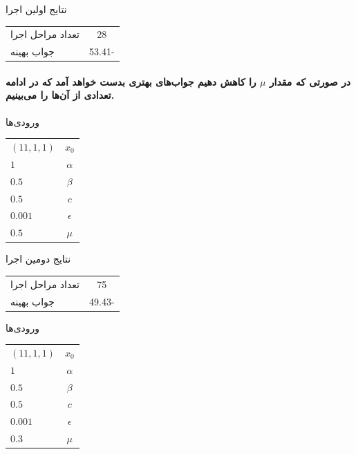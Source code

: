 \documentclass[paper=a4, fontsize=11pt]{article}
\numberwithin{equation}{section} %
\numberwithin{figure}{section} %
\numberwithin{table}{section} %
\begin{document}
\begin{center}
	نتایج اولین اجرا\\
	\begin{tabular}{| l | c |}
		\hline
		تعداد مراحل اجرا & 28 \\
		جواب بهینه & 53.41- \\
		\hline
	\end{tabular}
\end{center}

\paragraph{
	در صورتی که مقدار $\mu$ را کاهش دهیم جواب‌های بهتری بدست خواهد آمد که در ادامه تعدادی از آن‌ها را می‌بینیم.
}

\begin{center}
	ورودی‌ها\\
	\begin{tabular}{| l | c |}
		\hline
		$(11, 1, 1)$ & $x_0$ \\
		$1$ & $\alpha$ \\
		$0.5$ & $\beta$ \\
		$0.5$ & $c$ \\
		$0.001$ & $\epsilon$ \\
		$0.5$ & $\mu$ \\
		\hline
	\end{tabular}
\end{center}

\begin{center}
	نتایج دومین اجرا\\
	\begin{tabular}{| l | c |}
		\hline
		تعداد مراحل اجرا & 75 \\
		جواب بهینه & 49.43- \\
		\hline
	\end{tabular}
\end{center}

\begin{center}
	ورودی‌ها\\
	\begin{tabular}{| l | c |}
		\hline
		$(11, 1, 1)$ & $x_0$ \\
		$1$ & $\alpha$ \\
		$0.5$ & $\beta$ \\
		$0.5$ & $c$ \\
		$0.001$ & $\epsilon$ \\
		$0.3$ & $\mu$ \\
		\hline
	\end{tabular}
\end{center}
\end{document}
